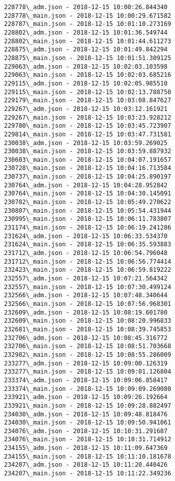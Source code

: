 \documentclass[11pt]{article}
\begin{document}
\begin{Verbatim}[commandchars=\\\{\}]
228778\_adm.json - 2018-12-15 10:00:26.844340
228778\_main.json - 2018-12-15 10:00:29.671582
228787\_main.json - 2018-12-15 10:01:10.273169
228802\_adm.json - 2018-12-15 10:01:36.549744
228802\_main.json - 2018-12-15 10:01:44.611273
228875\_adm.json - 2018-12-15 10:01:49.842294
228875\_main.json - 2018-12-15 10:01:51.309125
229063\_adm.json - 2018-12-15 10:02:03.103598
229063\_main.json - 2018-12-15 10:02:03.685216
229115\_adm.json - 2018-12-15 10:02:05.985510
229115\_main.json - 2018-12-15 10:02:13.788750
229179\_main.json - 2018-12-15 10:03:08.847627
229267\_adm.json - 2018-12-15 10:03:12.161921
229267\_main.json - 2018-12-15 10:03:23.928212
229780\_main.json - 2018-12-15 10:03:45.723907
229814\_main.json - 2018-12-15 10:03:47.731581
230038\_adm.json - 2018-12-15 10:03:59.269025
230038\_main.json - 2018-12-15 10:03:59.887932
230603\_main.json - 2018-12-15 10:04:07.191657
230728\_main.json - 2018-12-15 10:04:16.713584
230737\_main.json - 2018-12-15 10:04:25.890197
230764\_adm.json - 2018-12-15 10:04:28.952842
230764\_main.json - 2018-12-15 10:04:30.145091
230782\_main.json - 2018-12-15 10:05:49.270622
230807\_main.json - 2018-12-15 10:05:54.431944
230995\_main.json - 2018-12-15 10:06:11.783807
231174\_main.json - 2018-12-15 10:06:19.241286
231624\_adm.json - 2018-12-15 10:06:33.534370
231624\_main.json - 2018-12-15 10:06:35.593883
231712\_adm.json - 2018-12-15 10:06:54.796048
231712\_main.json - 2018-12-15 10:06:56.774414
232423\_main.json - 2018-12-15 10:06:59.819222
232557\_adm.json - 2018-12-15 10:07:21.564342
232557\_main.json - 2018-12-15 10:07:30.499124
232566\_adm.json - 2018-12-15 10:07:48.340644
232566\_main.json - 2018-12-15 10:07:56.968301
232609\_adm.json - 2018-12-15 10:08:19.601780
232609\_main.json - 2018-12-15 10:08:20.996833
232681\_main.json - 2018-12-15 10:08:39.745853
232706\_adm.json - 2018-12-15 10:08:45.316772
232706\_main.json - 2018-12-15 10:08:51.703668
232982\_main.json - 2018-12-15 10:08:55.286009
233277\_adm.json - 2018-12-15 10:09:00.126319
233277\_main.json - 2018-12-15 10:09:01.126804
233374\_adm.json - 2018-12-15 10:09:06.858417
233374\_main.json - 2018-12-15 10:09:09.269080
233921\_adm.json - 2018-12-15 10:09:26.192664
233921\_main.json - 2018-12-15 10:09:28.882497
234030\_adm.json - 2018-12-15 10:09:48.818476
234030\_main.json - 2018-12-15 10:09:50.941061
234076\_adm.json - 2018-12-15 10:10:31.291687
234076\_main.json - 2018-12-15 10:10:31.714912
234155\_adm.json - 2018-12-15 10:11:09.647369
234155\_main.json - 2018-12-15 10:11:10.181678
234207\_adm.json - 2018-12-15 10:11:20.440426
234207\_main.json - 2018-12-15 10:11:22.349236

\end{Verbatim}
\end{document}

